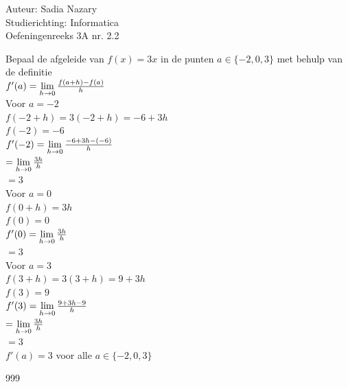 \documentclass[a4paper]{article}
\begin{document}
\noindent \large Auteur: Sadia Nazary \\
\noindent \large Studierichting: Informatica \\
\noindent \large Oefeningenreeks 3A nr. 2.2 \\

\medskip

\normalsize

Bepaal de afgeleide van $f(x)=3x$ in de punten $a \in \{-2,0,3\}$ met behulp van de definitie \\

$f'(a)=\lim\limits_{h \to 0} {{f(a+h)-f(a)} \over h}$ \\

Voor $a=-2$ \\

$f(-2+h)=3(-2+h)=-6+3h$ \\

$f(-2)=-6$ \\

$f'(-2)=\lim\limits_{h \to 0} {{-6+3h-(-6)} \over h}$ \\

$=\lim\limits_{h \to 0} {{3h} \over h}$ \\

$=3$ \\

Voor $a=0$ \\

$f(0+h)=3h$ \\

$f(0)=0$ \\

$f'(0)=\lim\limits_{h \to 0} {{3h} \over h}$ \\

$=3$ \\

Voor $a=3$ \\

$f(3+h)=3(3+h)=9+3h$ \\

$f(3)=9$ \\

$f'(3)=\lim\limits_{h \to 0} {{9+3h-9} \over h}$ \\

$=\lim\limits_{h \to 0} {{3h} \over h}$ \\

$=3$ \\

$f'(a)=3$ voor alle $a \in \{-2,0,3\}$ \\

\begin{thebibliography}{999}
\end{thebibliography}
\end{document}
